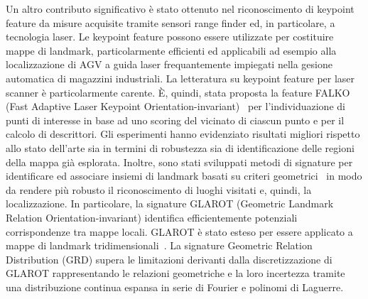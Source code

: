 \documentclass[11pt]{article}
\begin{document}


Un altro contributo significativo \`e stato ottenuto nel riconoscimento di keypoint feature da misure acquisite tramite sensori range finder ed, in particolare, a tecnologia laser. 
Le keypoint feature possono essere utilizzate per costituire mappe di landmark, particolarmente efficienti ed applicabili ad esempio alla localizzazione di AGV a guida laser frequantemente impiegati nella gesione automatica di magazzini industriali. 
La letteratura su keypoint feature per laser scanner \`e particolarmente carente. 
\`E, quindi, stata proposta la feature FALKO (Fast Adaptive Laser Keypoint Orientation-invariant)~\cite{kallasi2016ral} per l'individuazione di punti di interesse in base ad uno scoring del vicinato di ciascun punto e per il calcolo di descrittori. 
Gli esperimenti hanno evidenziato risultati migliori rispetto allo stato dell'arte sia in termini di robustezza sia di identificazione delle regioni della mappa gi\`a esplorata. 
Inoltre, sono stati sviluppati metodi di signature per identificare ed associare insiemi di landmark basati su criteri geometrici~\cite{lodirizzini2019ral, lodirizzini2017iros, kallasi2016iros} in modo da rendere pi\`u robusto il riconoscimento di luoghi visitati e, quindi, la localizzazione. 
In particolare, la signature GLAROT (Geometric Landmark Relation Orientation-invariant) identifica efficientemente potenziali corrispondenze tra mappe locali. 
GLAROT \`e stato esteso per essere applicato a mappe di landmark tridimensionali~\cite{lodirizzini2017iros}. 
La signature Geometric Relation Distribution (GRD) supera le limitazioni derivanti dalla discretizzazione di GLAROT rappresentando le relazioni geometriche e la loro incertezza tramite una distribuzione continua espansa in serie di Fourier e polinomi di Laguerre. 
\end{document}
